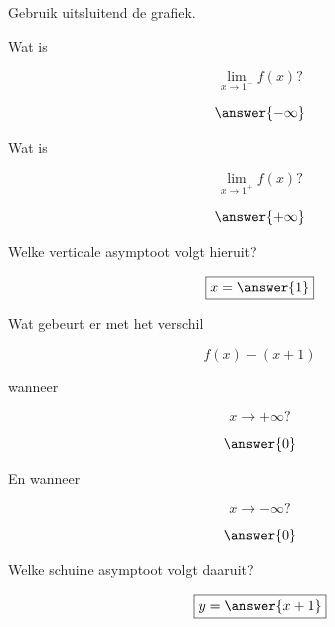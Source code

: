 \documentclass{ximera}
\begin{document}
\begin{oefening}{\oefU\ESS}

Gebruik uitsluitend de grafiek.

\begin{question}

Wat is

\[
\lim_{x\to1^-}f(x)?
\]

\[
\answer{-\infty}
\]

\end{question}

\begin{question}

Wat is

\[
\lim_{x\to1^+}f(x)?
\]

\[
\answer{+\infty}
\]

\end{question}

\begin{question}

Welke verticale asymptoot volgt hieruit?

\[
\boxed{x=\answer{1}}
\]

\end{question}

\begin{question}

Wat gebeurt er met het verschil

\[
f(x)-(x+1)
\]

wanneer

\[
x\to+\infty?
\]

\[
\answer{0}
\]

\end{question}

\begin{question}

En wanneer

\[
x\to-\infty?
\]

\[
\answer{0}
\]

\end{question}

\begin{question}

Welke schuine asymptoot volgt daaruit?

\[
\boxed{y=\answer{x+1}}
\]

\end{question}

\end{oefening}
\end{document}
